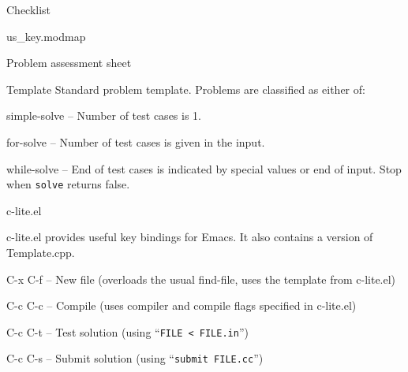 \categorycontents{}


\begin{algorithm}{Checklist}
\end{algorithm}

\begin{algorithm}{us\_key.modmap}
\end{algorithm}


\begin{algorithm}{Problem assessment sheet}
\usage{}
\end{algorithm}

\begin{algorithm}{Template}
\usage{}
Standard problem template. Problems are classified as either of:
  \begin{description}
  \item{simple-solve} -- Number of test cases is 1.
  \item{for-solve} -- Number of test cases is given in the input.
  \item{while-solve} -- End of test cases is indicated by special values
    or end of input. Stop when {\tt solve} returns false.
  \end{description}
\end{algorithm}

\begin{algorithm}{c-lite.el}

  c-lite.el provides useful key bindings for Emacs. It also contains a version of Template.cpp.
  \begin{description}
  \item{C-x C-f} -- New file (overloads the usual find-file, uses the template from c-lite.el)
  \item{C-c C-c} -- Compile (uses compiler and compile flags specified in c-lite.el)
  \item{C-c C-t} -- Test solution (using ``\texttt{FILE < FILE.in}'')
  \item{C-c C-s} -- Submit solution (using ``\texttt{submit FILE.cc}'')
  \end{description} 
\end{algorithm}

